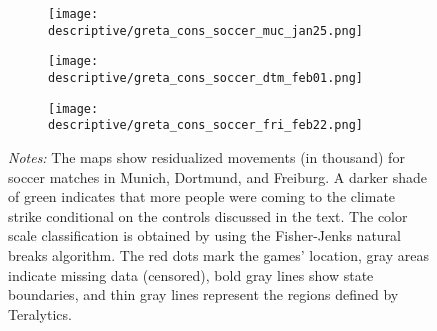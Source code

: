\begin{figure}[H]\centering
	\caption{Validation: Participation soccer games}
	\label{fig_greta_cons:participation_soccer_games}
	\begin{subfigure}[h]{0.45\linewidth}\centering
		\texttt{[image: descriptive/greta\_cons\_soccer\_muc\_jan25.png]}
	\end{subfigure}
	\begin{subfigure}[h]{0.45\linewidth}\centering
		\texttt{[image: descriptive/greta\_cons\_soccer\_dtm\_feb01.png]}
	\end{subfigure}
	\begin{subfigure}[h]{0.45\linewidth}\centering
		\texttt{[image: descriptive/greta\_cons\_soccer\_fri\_feb22.png]}
	\end{subfigure}
	
	\begin{minipage}{0.9\linewidth}
		\scriptsize{\emph{Notes:} The maps show residualized movements (in thousand) for soccer matches in Munich, Dortmund, and Freiburg. A darker shade of green indicates that more people were coming to the climate strike conditional on the controls discussed in the text. The color scale classification is obtained by using the Fisher-Jenks natural breaks algorithm. The red dots mark the games' location, gray areas indicate missing data (censored), bold gray lines show state boundaries, and thin gray lines represent the regions defined by Teralytics.}
	\end{minipage}
\end{figure}


